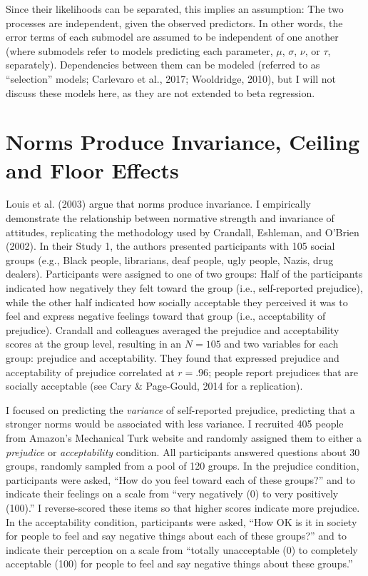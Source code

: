 \documentclass[english,man]{apa6}
\newcounter{author}
\theoremstyle{definition}
\theoremstyle{definition}
\theoremstyle{remark}
\begin{document}
Since their likelihoods can be separated, this implies an assumption:
The two processes are independent, given the observed predictors. In
other words, the error terms of each submodel are assumed to be
independent of one another (where submodels refer to models predicting
each parameter, \(\mu\), \(\sigma\), \(\nu\), or \(\tau\), separately).
Dependencies between them can be modeled (referred to as ``selection''
models; Carlevaro et al., 2017; Wooldridge, 2010), but I will not
discuss these models here, as they are not extended to beta regression.

\section{Norms Produce Invariance, Ceiling and Floor
Effects}\label{norms-produce-invariance-ceiling-and-floor-effects}

Louis et al. (2003) argue that norms produce invariance. I empirically
demonstrate the relationship between normative strength and invariance
of attitudes, replicating the methodology used by Crandall, Eshleman,
and O'Brien (2002). In their Study 1, the authors presented participants
with 105 social groups (e.g., Black people, librarians, deaf people,
ugly people, Nazis, drug dealers). Participants were assigned to one of
two groups: Half of the participants indicated how negatively they felt
toward the group (i.e., self-reported prejudice), while the other half
indicated how socially acceptable they perceived it was to feel and
express negative feelings toward that group (i.e., acceptability of
prejudice). Crandall and colleagues averaged the prejudice and
acceptability scores at the group level, resulting in an \(N = 105\) and
two variables for each group: prejudice and acceptability. They found
that expressed prejudice and acceptability of prejudice correlated at
\(r = .96\); people report prejudices that are socially acceptable (see
Cary \& Page-Gould, 2014 for a replication).

I focused on predicting the \emph{variance} of self-reported prejudice,
predicting that a stronger norms would be associated with less variance.
I recruited 405 people from Amazon's Mechanical Turk website and
randomly assigned them to either a \emph{prejudice} or
\emph{acceptability} condition. All participants answered questions
about 30 groups, randomly sampled from a pool of 120 groups. In the
prejudice condition, participants were asked, \enquote{How do you feel
toward each of these groups?} and to indicate their feelings on a scale
from \enquote{very negatively (0) to very positively (100).} I
reverse-scored these items so that higher scores indicate more
prejudice. In the acceptability condition, participants were asked,
\enquote{How OK is it in society for people to feel and say negative
things about each of these groups?} and to indicate their perception on
a scale from \enquote{totally unacceptable (0) to completely acceptable
(100) for people to feel and say negative things about these groups.}
\end{document}
